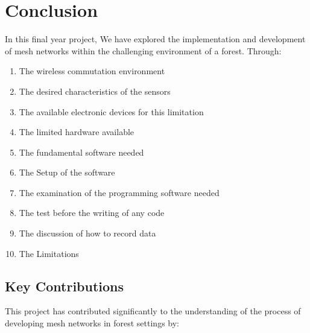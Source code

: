\section{Conclusion}
\label{ch:conclusion} %
In this final year project, We have explored the implementation and development of mesh networks within the challenging environment of a forest. Through:
\begin{enumerate}
    \item The wireless commutation environment 
    \item The desired characteristics of the sensors
    \item The available electronic devices for this limitation
    \item The limited hardware available
    \item The  fundamental software needed
    \item The Setup of the software
    \item The examination of the programming software needed
    \item The test before the writing of any code 
    \item The discussion of how to record data
    \item The Limitations
\end{enumerate}
\subsection{Key Contributions}

This project has contributed significantly to the understanding of the process of developing mesh networks in forest settings by:

